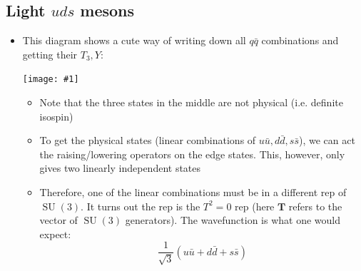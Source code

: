 \documentclass[11pt]{article}
\newcommand{\ubar}{\bar{u}}
\newcommand{\sbar}{\bar{s}}
\newcommand{\qbar}{{\bar{q}}}
\newcommand{\dbar}{\bar{d}}
\DeclareMathOperator{\SU}{SU}
\newcommand{\T}{\mathbf{T}}
\newcommand{\embedimgw}[2]{\begin{center}\texttt{[image: \#1]}\end{center}}
\begin{document}
\subsection{Light $uds$ mesons}
\begin{itemize}
  \item This diagram shows a cute way of writing down all $q\qbar$ combinations and getting their $T_3,Y$:
  \embedimgw{figs/mesons1.png}{.6}
  \begin{itemize}
    \item Note that the three states in the middle are not physical (i.e. definite isospin)
    \item To get the physical states (linear combinations of $u\ubar,d\dbar,s\sbar$), we can act the raising/lowering operators on the edge states. This, however, only gives two linearly independent states
    \item Therefore, one of the linear combinations must be in a different rep of $\SU(3)$. It turns out the rep is the $T^2=0$ rep (here $\T$ refers to the vector of $\SU(3)$ generators). The wavefunction is what one would expect:
    \begin{equation}
      \frac{1}{\sqrt3} \left(u\ubar+d\dbar+s\sbar\right)
    \end{equation}
  \end{itemize}
\end{itemize}
\end{document}
